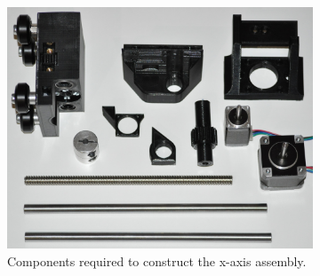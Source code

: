 \begin{figure}[H]
	\centering
	\begin{subfigure}[b]{0.7\textwidth}
		\includegraphics[width=\textwidth]{figures/202108/disassembled-x-axis-assembly.JPG}
		\caption{Components required to construct the x-axis assembly.}
		\label{fig:disassembled-x-axis-assembly}
	\end{subfigure}
	\begin{subfigure}[b]{0.212\textwidth}

\end{subfigure}
\end{figure}
